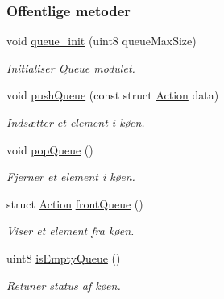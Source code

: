 \subsubsection*{Offentlige metoder}
\begin{DoxyCompactItemize}
\item 
void \hyperlink{class_queue_a4e0a3758d721506e7729f4d074a280ff}{queue\+\_\+init} (uint8 queue\+Max\+Size)
\begin{DoxyCompactList}\small\item\em Initialiser \hyperlink{class_queue}{Queue} modulet. \end{DoxyCompactList}\item 
void \hyperlink{class_queue_a0012fa831aa1529e5ed3a6610b733423}{push\+Queue} (const struct \hyperlink{queue_8h_struct_action}{Action} data)
\begin{DoxyCompactList}\small\item\em Indsætter et element i køen. \end{DoxyCompactList}\item 
void \hyperlink{class_queue_a9ecab9ecdedfc331aed9a0ae63ce193b}{pop\+Queue} ()
\begin{DoxyCompactList}\small\item\em Fjerner et element i køen. \end{DoxyCompactList}\item 
struct \hyperlink{queue_8h_struct_action}{Action} \hyperlink{class_queue_a49c50ba30a42033068d8d8e6a23c6ca1}{front\+Queue} ()
\begin{DoxyCompactList}\small\item\em Viser et element fra køen. \end{DoxyCompactList}\item 
uint8 \hyperlink{class_queue_aafb324c79731abdc228dbf94d86722a3}{is\+Empty\+Queue} ()
\begin{DoxyCompactList}\small\item\em Retuner status af køen. \end{DoxyCompactList}\end{DoxyCompactItemize}
